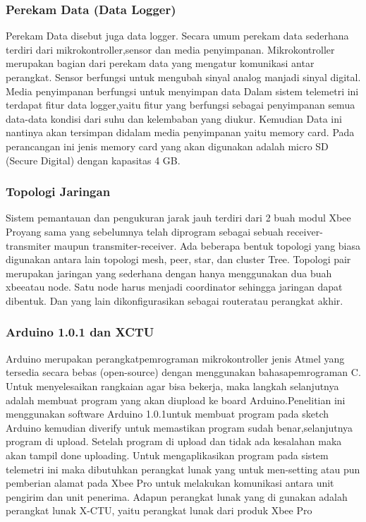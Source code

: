 \subsubsection{Perekam Data (Data Logger)}
 Perekam Data disebut juga data logger. Secara umum perekam data sederhana terdiri dari mikrokontroller,sensor dan media penyimpanan.
Mikrokontroller merupakan bagian dari perekam data yang mengatur komunikasi antar perangkat. Sensor berfungsi untuk mengubah sinyal analog manjadi sinyal digital. Media penyimpanan berfungsi untuk menyimpan data Dalam sistem telemetri ini terdapat fitur data logger,yaitu fitur yang berfungsi sebagai penyimpanan semua data-data kondisi dari suhu dan kelembaban yang diukur. Kemudian Data ini nantinya akan
tersimpan didalam media penyimpanan yaitu memory card. Pada perancangan ini jenis memory card yang akan digunakan adalah micro SD 
(Secure Digital) dengan kapasitas 4 GB.

\subsubsection{Topologi Jaringan}
Sistem pemantauan dan pengukuran jarak jauh terdiri dari 2 buah modul 
Xbee Proyang sama yang sebelumnya telah diprogram sebagai sebuah receiver-transmiter maupun transmiter-receiver. Ada beberapa bentuk topologi yang biasa digunakan antara lain topologi mesh, peer, star, dan cluster Tree.
Topologi pair merupakan jaringan yang sederhana dengan hanya menggunakan dua buah xbeeatau node. Satu node harus menjadi coordinator sehingga jaringan dapat dibentuk. Dan yang lain dikonfigurasikan sebagai routeratau perangkat akhir.

\subsubsection {Arduino 1.0.1 dan XCTU}
Arduino merupakan perangkatpemrograman mikrokontroller jenis Atmel yang tersedia secara bebas (open-source)
dengan menggunakan bahasapemrograman C. Untuk menyelesaikan rangkaian agar bisa bekerja, maka langkah selanjutnya adalah membuat program yang
akan diupload ke board Arduino.Penelitian ini menggunakan software Arduino 1.0.1untuk membuat program pada sketch Arduino kemudian diverify
untuk memastikan program sudah benar,selanjutnya program di upload. Setelah program di upload dan tidak ada kesalahan
maka akan tampil done uploading. Untuk mengaplikasikan program pada sistem telemetri ini maka dibutuhkan perangkat lunak yang untuk men-setting atau pun pemberian alamat pada Xbee Pro untuk melakukan komunikasi antara unit pengirim dan unit penerima. Adapun
perangkat lunak yang di gunakan adalah perangkat lunak X-CTU, yaitu perangkat lunak dari produk Xbee Pro
